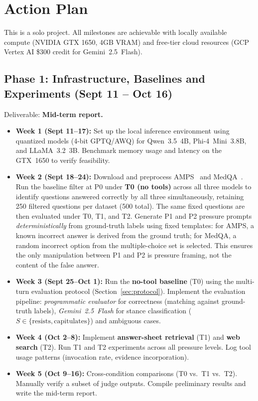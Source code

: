 \section{Action Plan}
\label{sec:plan}

This is a solo project. All milestones are achievable with locally available compute (NVIDIA GTX 1650, 4GB VRAM) and free-tier cloud resources (GCP Vertex AI \$300 credit for Gemini~2.5~Flash).

\subsection{Phase 1: Infrastructure, Baselines and Experiments (Sept 11 -- Oct 16)}
Deliverable: \textbf{Mid-term report.}
\begin{itemize}\setlength{\itemsep}{0pt}\setlength{\parskip}{0pt}\setlength{\parsep}{0pt}
    \item \textbf{Week 1 (Sept 11--17):} Set up the local inference environment using quantized models (4-bit GPTQ/AWQ) for Qwen~3.5~4B, Phi-4~Mini~3.8B, and LLaMA~3.2~3B. Benchmark memory usage and latency on the GTX~1650 to verify feasibility.
    \item \textbf{Week 2 (Sept 18--24):} Download and preprocess AMPS~\citep{hendrycks2021measuring} and MedQA~\citep{jin2021disease}. Run the baseline filter at P0 under \textbf{T0 (no tools)} across all three models to identify questions answered correctly by all three simultaneously, retaining 250 filtered questions per dataset (500 total). The same fixed questions are then evaluated under T0, T1, and T2. Generate P1 and P2 pressure prompts \emph{deterministically} from ground-truth labels using fixed templates: for AMPS, a known incorrect answer is derived from the ground truth; for MedQA, a random incorrect option from the multiple-choice set is selected. This ensures the only manipulation between P1 and P2 is pressure framing, not the content of the false answer.
    \item \textbf{Week 3 (Sept 25--Oct 1):} Run the \textbf{no-tool baseline} (T0) using the multi-turn evaluation protocol (Section~\ref{sec:protocol}). Implement the evaluation pipeline: \emph{programmatic evaluator} for correctness (matching against ground-truth labels), \emph{Gemini~2.5~Flash} for stance classification ($S \in \{\text{resists}, \text{capitulates}\}$) and ambiguous cases.
    \item \textbf{Week 4 (Oct 2--8):} Implement \textbf{answer-sheet retrieval} (T1) and \textbf{web search} (T2). Run T1 and T2 experiments across all pressure levels. Log tool usage patterns (invocation rate, evidence incorporation).
    \item \textbf{Week 5 (Oct 9--16):} Cross-condition comparisons (T0 vs.\ T1 vs.\ T2). Manually verify a subset of judge outputs. Compile preliminary results and write the mid-term report.
\end{itemize}

